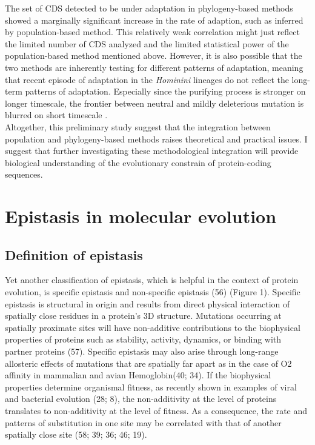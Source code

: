 The set of CDS detected to be under adaptation in phylogeny-based methods showed a marginally significant increase in the rate of adaption, such as inferred by population-based method. This relatively weak correlation might just reflect the limited number of CDS analyzed and the limited statistical power of the population-based method mentioned above. However, it is also possible that the two methods are inherently testing for different patterns of adaptation, meaning that recent episode of adaptation in the \textit{Hominini} lineages do not reflect the long-term patterns of adaptation. Especially since the purifying process is stronger on longer timescale, the frontier between \gls{neutral} and mildly deleterious mutation is blurred on short timescale \citep{ho_time_2005}. \\

Altogether, this preliminary study suggest that the integration between population and phylogeny-based methods raises theoretical and practical issues. I suggest that further investigating these methodological integration will provide biological understanding of the evolutionary constrain of protein-coding sequences. \\


\section{Epistasis in molecular evolution}

\subsection{Definition of epistasis}

Yet another classification of epistasis, which is helpful in the context of protein evolution,
is specific epistasis and non-specific epistasis (56) (Figure 1). Specific epistasis is structural in origin and results from direct physical interaction of spatially close residues in a protein’s 3D structure. Mutations occurring at spatially proximate sites will have non-additive contributions to the biophysical properties of proteins such as stability, activity, dynamics, or binding with partner proteins (57). Specific epistasis may also arise through long-range allosteric effects of mutations that are spatially far apart as in the case of O2 affinity in mammalian and avian Hemoglobin(40; 34). If the biophysical properties determine organismal fitness, as recently shown in examples of viral and bacterial evolution (28; 8), the non-additivity at the level of proteins translates to non-additivity at the level of fitness. As a consequence, the rate and patterns of \gls{substitution} in one site may be correlated with that of another spatially close site (58; 39; 36; 46; 19).

